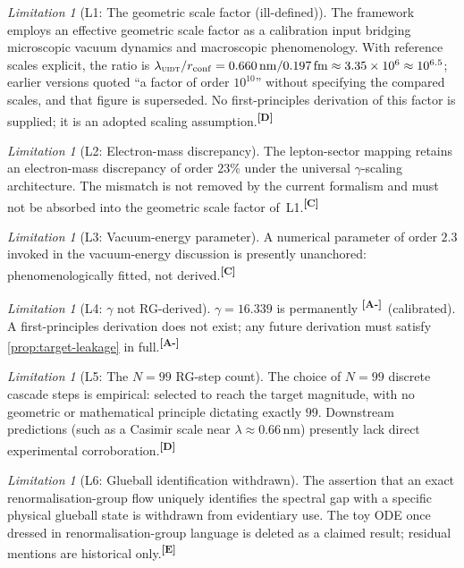 \documentclass[12pt,a4paper,twoside]{article}
\theoremstyle{plain}
\theoremstyle{definition}
\theoremstyle{remark}
\newtheorem{limitation}[theorem]{Limitation}
\newcommand{\UIDT}{\textsc{uidt}}
\newcommand{\catmark}[1]{\textsuperscript{\textsf{\textbf{[#1]}}}}
\newcommand{\GammaGeom}{16.339} %
\begin{document}
\begin{limitation}[L1: The geometric scale factor (ill-defined)]
\label{lim:L1}
The framework employs an effective geometric scale factor as a
calibration input bridging microscopic vacuum dynamics and macroscopic
phenomenology. With reference scales explicit, the ratio is
$\lambda_{\UIDT}/r_{\mathrm{conf}} =
0.660\,\mathrm{nm}/0.197\,\mathrm{fm} \approx 3.35\times10^{6} \approx
10^{6.5}$; earlier versions quoted ``a factor of order $10^{10}$''
without specifying the compared scales, and that figure is superseded.
No first-principles derivation of this factor is supplied; it is an
adopted scaling assumption.\catmark{D}
\end{limitation}

\begin{limitation}[L2: Electron-mass discrepancy]
\label{lim:L2}
The lepton-sector mapping retains an electron-mass discrepancy of order
$23\%$ under the universal $\gamma$-scaling architecture. The mismatch
is not removed by the current formalism and must not be absorbed into
the geometric scale factor of~L1.\catmark{C}
\end{limitation}

\begin{limitation}[L3: Vacuum-energy parameter]
\label{lim:L3}
A numerical parameter of order $2.3$ invoked in the vacuum-energy
discussion is presently unanchored: phenomenologically fitted, not
derived.\catmark{C}
\end{limitation}

\begin{limitation}[L4: $\gamma$ not RG-derived]
\label{lim:L4}
$\gamma = \GammaGeom$ is permanently \catmark{A-}\ (calibrated). A
first-principles derivation does not exist; any future derivation must
satisfy \cref{prop:target-leakage} in full.\catmark{A-}
\end{limitation}

\begin{limitation}[L5: The $N=99$ RG-step count]
\label{lim:L5}
The choice of $N=99$ discrete cascade steps is empirical: selected to
reach the target magnitude, with no geometric or mathematical principle
dictating exactly $99$. Downstream predictions (such as a Casimir scale
near $\lambda \approx 0.66\,\mathrm{nm}$) presently lack direct
experimental corroboration.\catmark{D}
\end{limitation}

\begin{limitation}[L6: Glueball identification withdrawn]
\label{lim:L6}
The assertion that an exact renormalisation-group flow uniquely
identifies the spectral gap with a specific physical glueball state is
withdrawn from evidentiary use. The toy ODE once dressed in
renormalisation-group language is deleted as a claimed result; residual
mentions are historical only.\catmark{E}
\end{limitation}
\end{document}
